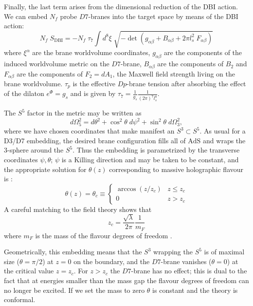 \documentclass[aps,preprint,nofootinbib,preprintnumbers,eqsecnum,superscriptaddress]{revtex4}
\def\th{{\theta}}
\begin{document}
Finally, the last term arises from the dimensional reduction of the DBI action. We can embed $N_f$ probe $D7$-branes into the target space by means of the DBI action:
\begin{equation}
	N_f \; S_{\text{DBI}} = - N_f\; \tau_7 \int{d^8\xi \; \sqrt{-\det\left(g_{\alpha \beta} + B_{\alpha \beta} + 2 \pi l_s^2 \; F_{\alpha \beta} \right)}}
\end{equation}
where $\xi^\alpha$ are the brane worldvolume coordinates, $g_{\alpha \beta}$ are the components of the induced worldvolume metric on the $D7$-brane, $B_{\alpha \beta}$ are the components of $B_2$ and $F_{\alpha \beta}$ are the components of $F_2 = dA_1$, the Maxwell field strength living on the brane worldvolume. $\tau_p$ is the effective $Dp$-brane tension after absorbing the effect of the dilaton $e^\Phi = g_s$ and is given by $\tau_7 = \frac{1}{g_s}\frac{1}{(2\pi)^7 l_s^8}$. 

The $S^5$ factor in the metric may be written as
\begin{equation}
d\Omega_5^2 = d\theta^2 + \cos^2{\theta} \; d\psi^2 + \sin^2{\theta} \; d\Omega_3^2,
\end{equation} 
where we have chosen coordinates that make manifest an $S^3 \subset S^5$. As usual for a D3/D7 embedding, the desired brane configuration fills all of $\text{AdS}$ and wraps the $3$-sphere around the $S^5$. Thus the embedding is parametrized by the transverse coordinates $\psi, \th$; $\psi$ is a Killing direction and may be taken to be constant, and the appropriate solution for $\th(z)$ corresponding to massive holographic flavour is \cite{Karch:2002sh}:
\begin{equation}
	\theta(z) = \theta_c \equiv
	\begin{cases} 
		\arccos(z/z_c)	& z\leq z_c \\
		0				& z > z_c
		\end{cases}
	\end{equation}
A careful matching to the field theory shows that
\begin{equation}
	z_c = \frac{\sqrt{\lambda}}{2\pi} \frac{1}{m_F}	\label{fermion-mass}
\end{equation}
where $m_F$ is the mass of the flavour degrees of freedom \cite{Karch:2007pd, Karch:2006bv}.

Geometrically, this embedding means that the $S^3$ wrapping the $S^5$ is of maximal size ($\theta=\pi/2$) at $z=0$ on the boundary, and the $D7$-brane vanishes ($\theta =0$) at the critical value $z=z_c$. For $z>z_c$ the $D7$-brane has no effect; this is dual to the fact that at energies smaller than the mass gap the flavour degrees of freedom can no longer be excited. If we set the mass to zero $\theta$ is constant and the theory is conformal. 
\end{document}
